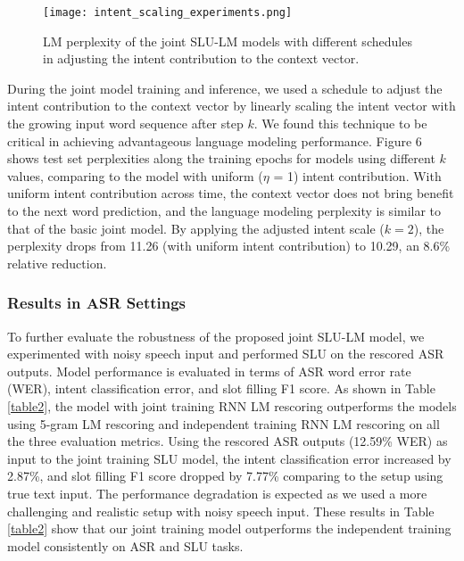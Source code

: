 \documentclass[11pt]{article}
\begin{document}
        \begin{figure}[h]
            \centering
            \texttt{[image: intent\_scaling\_experiments.png]}
            \caption{{LM perplexity of the joint SLU-LM models with different schedules in adjusting the intent contribution to the context vector. }}
            \label{fig:intent_scaling_experiments}
        \end{figure}
        
    During the joint model training and inference, we used a schedule to adjust the intent contribution to the context vector by linearly scaling the intent vector with the growing input word sequence after step $k$. We found this technique to be critical in achieving advantageous language modeling performance. Figure 6 shows test set perplexities along the training epochs for models using different $k$ values, comparing to the model with uniform ($\eta$ = 1) intent contribution. With uniform intent contribution across time, the context vector does not bring benefit to the next word prediction, and the language modeling perplexity is similar to that of the basic joint model. By applying the adjusted intent scale ($k=2$), the perplexity drops from 11.26 (with uniform intent contribution) to 10.29, an 8.6\% relative reduction.
 
    \subsubsection{Results in ASR Settings}
    To further evaluate the robustness of the proposed joint SLU-LM model, we experimented with noisy speech input and performed SLU on the rescored ASR outputs. Model performance is evaluated in terms of ASR word error rate (WER), intent classification error, and slot filling F1 score. As shown in Table \ref{table2}, the model with joint training RNN LM rescoring outperforms the models using 5-gram LM rescoring and independent training RNN LM rescoring on all the three evaluation metrics. Using the rescored ASR outputs (12.59\% WER) as input to the joint training SLU model, the intent classification error increased by 2.87\%, and slot filling F1 score dropped by 7.77\% comparing to the setup using true text input. The performance degradation is expected as we used a more challenging and realistic setup with noisy speech input. These results in Table \ref{table2} show that our joint training model outperforms the independent training model consistently on ASR and SLU tasks.
    
\end{document}
